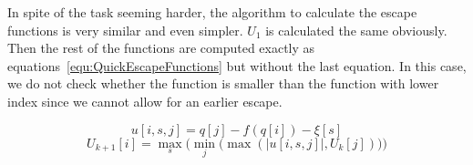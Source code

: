 In spite of the task seeming harder, the algorithm to calculate the escape functions is very similar and even simpler. $U_1$ is calculated the same obviously. Then the rest of the functions are computed exactly as equations~\ref{equ:QuickEscapeFunctions} but without the last equation. In this case, we do not check whether the function is smaller than the function with lower index since we cannot allow for an earlier escape.

\begin{equation*}
u[i,s,j] = q[j] - f(q[i]) - \xi[s]
\end{equation*}
\begin{equation}
U_{k+1}[i]=\max_s\Big(\min_j\big(\max(|u[i,s,j]|,U_k[j])\big)\Big)
\label{equ:ExactEscapeFunctions}
\end{equation}






